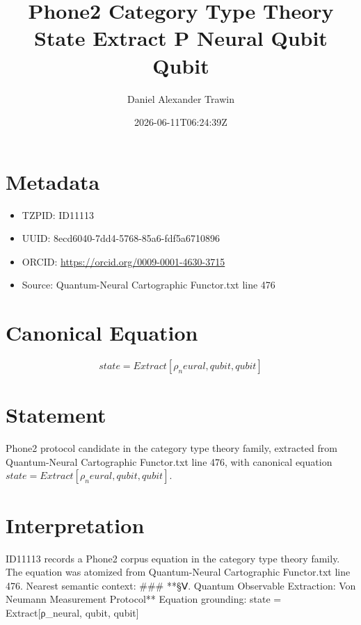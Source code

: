 \documentclass[11pt]{article}
\title{Phone2 Category Type Theory State Extract Ρ Neural Qubit Qubit}
\author{Daniel Alexander Trawin}
\date{2026-06-11T06:24:39Z}
\begin{document}
\maketitle
\section*{Metadata}
\begin{itemize}
\item TZPID: ID11113
\item UUID: 8ecd6040-7dd4-5768-85a6-fdf5a6710896
\item ORCID: \url{https://orcid.org/0009-0001-4630-3715}
\item Source: Quantum-Neural Cartographic Functor.txt line 476
\end{itemize}
\section*{Canonical Equation}
\[
state = Extract[ρ_neural, {qubit, qubit}]
\]
\section*{Statement}
Phone2 protocol candidate in the category type theory family, extracted from Quantum-Neural Cartographic Functor.txt line 476, with canonical equation $state = Extract[ρ_neural, {qubit, qubit}]$.
\section*{Interpretation}
ID11113 records a Phone2 corpus equation in the category type theory family. The equation was atomized from Quantum-Neural Cartographic Functor.txt line 476. Nearest semantic context: ### **§Ⅴ. Quantum Observable Extraction: Von Neumann Measurement Protocol** Equation grounding: state = Extract[ρ_neural, {qubit, qubit}]
\end{document}
